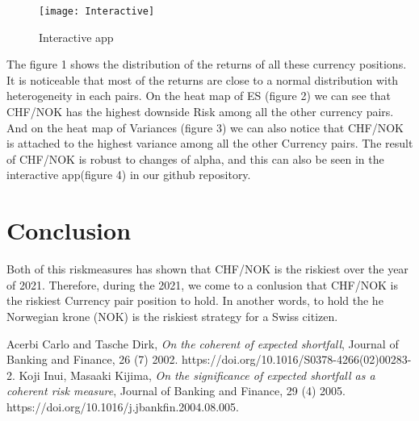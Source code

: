 \documentclass{article}
\begin{document}
\begin{figure}[H]
\centering
\texttt{[image: Interactive]}
\caption{Interactive app}\label{visina8}
\end{figure}


The figure 1 shows the distribution of the returns of all these currency positions. It is noticeable that most of the returns are close to a normal distribution with heterogeneity in each pairs. On the heat map of ES (figure 2) we can see that CHF/NOK has the highest downside Risk among all the other currency pairs. And on the heat map of Variances (figure 3) we can also notice that CHF/NOK is attached to the highest variance among all the other Currency pairs. The result of CHF/NOK is robust to changes of alpha, and this can also be seen in the interactive app(figure 4) in our github repository.

\section{Conclusion}
Both of this riskmeasures has shown that CHF/NOK is the riskiest over the year of 2021. Therefore, during the 2021, we come to a conlusion that CHF/NOK is the riskiest Currency pair position to hold. In another words, to hold the he Norwegian krone (NOK) is the riskiest strategy for a Swiss citizen.

\begin{thebibliography}{10}

	Acerbi Carlo and Tasche Dirk,
	\textit{On the coherent of expected shortfall},
  	Journal of Banking and Finance,
  	26 (7)
  	2002.
	https://doi.org/10.1016/S0378-4266(02)00283-2.
	Koji Inui, Masaaki Kijima,
	\textit{On the significance of expected shortfall as a coherent risk measure},
  	Journal of Banking and Finance,
  	29 (4)
  	2005.
	https://doi.org/10.1016/j.jbankfin.2004.08.005.

\end{thebibliography}
\end{document}
